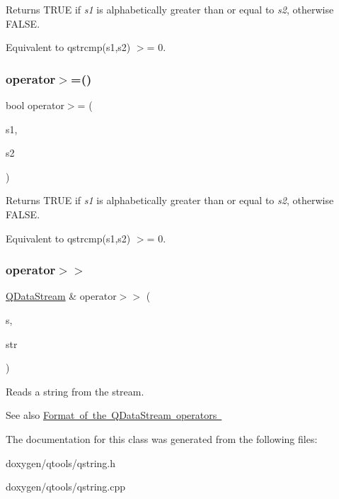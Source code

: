 Returns T\+R\+UE if {\itshape s1} is alphabetically greater than or equal to {\itshape s2}, otherwise F\+A\+L\+SE.

Equivalent to {\ttfamily qstrcmp(s1,s2) $>$= 0}. \mbox{\label{class_q_string_a19a6ef539052453895b39db1f25ec5a2}} 
\subsubsection{\texorpdfstring{operator$>$=()}{operator>=()}\hspace{0.1cm}{\footnotesize\ttfamily [2/2]}}
{\footnotesize\ttfamily bool operator$>$= (\begin{DoxyParamCaption}\item[{const \mbox{\hyperlink{class_q_string}{Q\+String}} \&}]{s1,  }\item[{const char $\ast$}]{s2 }\end{DoxyParamCaption})\hspace{0.3cm}{\ttfamily [related]}}

Returns T\+R\+UE if {\itshape s1} is alphabetically greater than or equal to {\itshape s2}, otherwise F\+A\+L\+SE.

Equivalent to {\ttfamily qstrcmp(s1,s2) $>$= 0}. \mbox{\label{class_q_string_ae8d642385fbe1a96358fe7432baf546b}} 
\subsubsection{\texorpdfstring{operator$>$$>$}{operator>>}}
{\footnotesize\ttfamily \mbox{\hyperlink{class_q_data_stream}{Q\+Data\+Stream}} \& operator$>$$>$ (\begin{DoxyParamCaption}\item[{\mbox{\hyperlink{class_q_data_stream}{Q\+Data\+Stream}} \&}]{s,  }\item[{\mbox{\hyperlink{class_q_string}{Q\+String}} \&}]{str }\end{DoxyParamCaption})\hspace{0.3cm}{\ttfamily [friend]}}

Reads a string from the stream.

\begin{DoxySeeAlso}{See also}
\mbox{\hyperlink{}{Format of the Q\+Data\+Stream operators }} 
\end{DoxySeeAlso}


The documentation for this class was generated from the following files\+:\begin{DoxyCompactItemize}
\item 
doxygen/qtools/qstring.\+h\item 
doxygen/qtools/qstring.\+cpp\end{DoxyCompactItemize}
